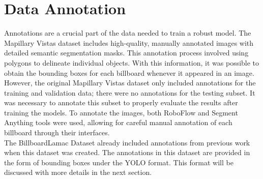 \section{Data Annotation}\label{sec:dataannotation}

Annotations are a crucial part of the data needed to train a robust model. The Mapillary Vistas dataset includes high-quality, manually annotated images with detailed semantic segmentation masks. This annotation process involved using polygons to delineate individual objects. With this information, it was possible to obtain the bounding boxes for each billboard whenever it appeared in an image.\\

However, the original Mapillary Vistas dataset only included annotations for the training and validation data; there were no annotations for the testing subset. It was necessary to annotate this subset to properly evaluate the results after training the models. To annotate the images, both RoboFlow and Segment Anything tools were used, allowing for careful manual annotation of each billboard through their interfaces.\\

The BillboardLamac Dataset already included annotations from previous work when this dataset was created. The annotations in this dataset are provided in the form of bounding boxes under the YOLO format. This format will be discussed with more details in the next section.